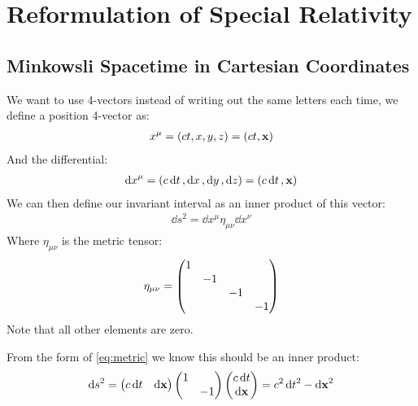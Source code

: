 \documentclass[12pt]{article}
\begin{document}
\section{Reformulation of Special Relativity}

\subsection{Minkowsli Spacetime in Cartesian Coordinates}
We want to use 4-vectors instead of writing out the same letters each time, we define a position 4-vector as:
\begin{align*}
  x^\mu=(ct,x,y,z)=(ct,\vb{x})
\end{align*}
And the differential:
\begin{align*}
  \dd{x}^\mu=(c\dd{t},\dd{x},\dd{y},\dd{z})=(c\dd{t},\vb{x})
\end{align*}
We can then define our invariant interval as an inner product of this vector:
\begin{align}
  \dd{s}^2=\dd{x}^\mu\eta_{\mu\nu}\dd{x}^\nu \label{eq:metric}
\end{align}
Where $\eta_{\mu\nu}$ is the metric tensor:
\begin{align*}
  \eta_{\mu\nu}=\pmqty{\dmat{1}{-1}{-1}{-1}}
\end{align*}
Note that all other elements are zero.

From the form of \eqref{eq:metric} we know this should be an inner product:
\begin{align*}
  \dd{s}^2=\pmqty{c\dd{t}& \dd{\vb{x}}}
  \pmqty{\dmat{1}{-1}}\pmqty{c\dd{t}\\ \dd{\vb{x}}}=c^2\dd{t}^2-\dd{\vb{x}}^2
\end{align*}
\end{document}
